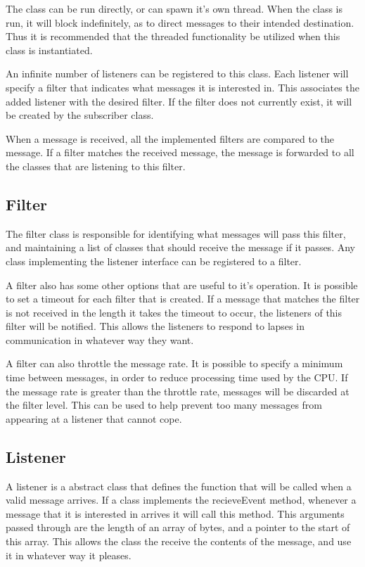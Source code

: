 The class can be run directly, or can spawn it's own thread. When the class is run, it will block indefinitely, as to direct messages to their intended destination. Thus it is recommended that the threaded functionality be utilized when this class is instantiated. 

An infinite number of listeners can be registered to this class. Each listener will specify a filter that indicates what messages it is interested in. This associates the added listener with the desired filter. If the filter does not currently exist, it will be created by the subscriber class.

When a message is received, all the implemented filters are compared to the message. If a filter matches the received message, the message is forwarded to all the classes that are listening to this filter.

\subsection{Filter}
\label{sec:toolkitfilter}

The filter class is responsible for identifying what messages will pass this filter, and maintaining a list of classes that should receive the message if it passes. Any class implementing the listener interface can be registered to a filter.

A filter also has some other options that are useful to it's operation. It is possible to set a timeout for each filter that is created. If a message that matches the filter is not received in the length it takes the timeout to occur, the listeners of this filter will be notified. This allows the listeners to respond to lapses in communication in whatever way they want. 

A filter can also throttle the message rate. It is possible to specify a minimum time between messages, in order to reduce processing time used by the CPU. If the message rate is greater than the throttle rate, messages will be discarded at the filter level. This can be used to help prevent too many messages from appearing at a listener that cannot cope.

\subsection{Listener}

A listener is a abstract class that defines the function that will be called when a valid message arrives. If a class implements the recieveEvent method, whenever a message that it is interested in arrives it will call this method. This arguments passed through are the length of an array of bytes, and a pointer to the start of this array. This allows the class the receive the contents of the message, and use it in whatever way it pleases.

